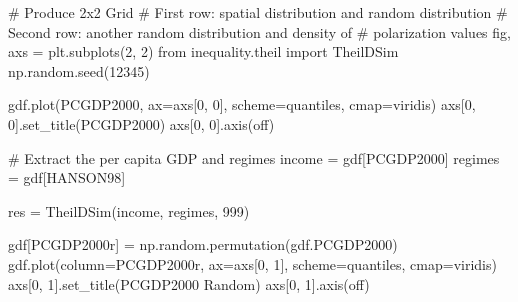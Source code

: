 \documentclass[
  a4paper, 
  twoside,
  final
]{article}
\newenvironment{Shaded}{\begin{snugshade}}{\end{snugshade}}
\newcommand{\CommentTok}[1]{\textcolor[rgb]{0.37,0.37,0.37}{#1}}
\newcommand{\DecValTok}[1]{\textcolor[rgb]{0.68,0.00,0.00}{#1}}
\newcommand{\ImportTok}[1]{\textcolor[rgb]{0.00,0.46,0.62}{#1}}
\newcommand{\NormalTok}[1]{\textcolor[rgb]{0.00,0.23,0.31}{#1}}
\newcommand{\OperatorTok}[1]{\textcolor[rgb]{0.37,0.37,0.37}{#1}}
\newcommand{\StringTok}[1]{\textcolor[rgb]{0.13,0.47,0.30}{#1}}
\begin{document}
\begin{Shaded}
\begin{Highlighting}[]
\CommentTok{\# Produce 2x2 Grid}
\CommentTok{\# First row: spatial distribution and random distribution}
\CommentTok{\# Second row: another random distribution and density of}
\CommentTok{\# polarization values}
\NormalTok{fig, axs }\OperatorTok{=}\NormalTok{ plt.subplots(}\DecValTok{2}\NormalTok{, }\DecValTok{2}\NormalTok{)}
\ImportTok{from}\NormalTok{ inequality.theil }\ImportTok{import}\NormalTok{ TheilDSim}
\NormalTok{np.random.seed(}\DecValTok{12345}\NormalTok{)}

\NormalTok{gdf.plot(}\StringTok{\textquotesingle{}PCGDP2000\textquotesingle{}}\NormalTok{, ax}\OperatorTok{=}\NormalTok{axs[}\DecValTok{0}\NormalTok{, }\DecValTok{0}\NormalTok{], scheme}\OperatorTok{=}\StringTok{\textquotesingle{}quantiles\textquotesingle{}}\NormalTok{,}
\NormalTok{         cmap}\OperatorTok{=}\StringTok{\textquotesingle{}viridis\textquotesingle{}}\NormalTok{)}
\NormalTok{axs[}\DecValTok{0}\NormalTok{, }\DecValTok{0}\NormalTok{].set\_title(}\StringTok{\textquotesingle{}PCGDP2000\textquotesingle{}}\NormalTok{)}
\NormalTok{axs[}\DecValTok{0}\NormalTok{, }\DecValTok{0}\NormalTok{].axis(}\StringTok{\textquotesingle{}off\textquotesingle{}}\NormalTok{)}

\CommentTok{\# Extract the per capita GDP and regimes}
\NormalTok{income }\OperatorTok{=}\NormalTok{ gdf[}\StringTok{\textquotesingle{}PCGDP2000\textquotesingle{}}\NormalTok{]}
\NormalTok{regimes }\OperatorTok{=}\NormalTok{ gdf[}\StringTok{\textquotesingle{}HANSON98\textquotesingle{}}\NormalTok{]}

\NormalTok{res }\OperatorTok{=}\NormalTok{ TheilDSim(income, regimes, }\DecValTok{999}\NormalTok{)}

\NormalTok{gdf[}\StringTok{\textquotesingle{}PCGDP2000r\textquotesingle{}}\NormalTok{] }\OperatorTok{=}\NormalTok{ np.random.permutation(gdf.PCGDP2000)}
\NormalTok{gdf.plot(column}\OperatorTok{=}\StringTok{\textquotesingle{}PCGDP2000r\textquotesingle{}}\NormalTok{, ax}\OperatorTok{=}\NormalTok{axs[}\DecValTok{0}\NormalTok{, }\DecValTok{1}\NormalTok{], scheme}\OperatorTok{=}\StringTok{\textquotesingle{}quantiles\textquotesingle{}}\NormalTok{,}
\NormalTok{         cmap}\OperatorTok{=}\StringTok{\textquotesingle{}viridis\textquotesingle{}}\NormalTok{)}
\NormalTok{axs[}\DecValTok{0}\NormalTok{, }\DecValTok{1}\NormalTok{].set\_title(}\StringTok{\textquotesingle{}PCGDP2000 Random\textquotesingle{}}\NormalTok{)}
\NormalTok{axs[}\DecValTok{0}\NormalTok{, }\DecValTok{1}\NormalTok{].axis(}\StringTok{\textquotesingle{}off\textquotesingle{}}\NormalTok{)}




\end{Highlighting}
\end{Shaded}
\end{document}

